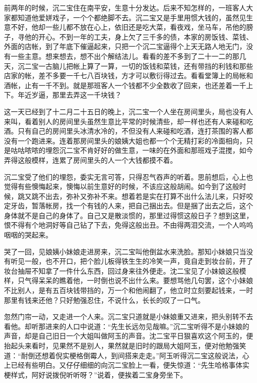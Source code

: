 \documentclass[12pt,UTF8]{ctexbook}
\begin{document}
{{{前两年的时候，沉二宝住在南平安，生意十分发达。后来不知怎样的，一班客人大家都知道他爱姘戏子，一个个都绝脚不去。沉二宝又是手里用惯大钱的，虽然见生意不好，他却一些儿都不放在心上，依旧还是吃大菜，看夜戏，坐马车，吊他的膀子，寻他的开心。不到一年的工夫，身上欠了三千多的债，本家的房饭钱、菜钱、外面的店帐，到了年底下催逼起来，只把一个沉二宝逼得个上天无路人地无门，没有一些主意。想来想去，想不出个解结法儿。看看的差不多到了二十一二的那几天，沉二宝一古脑儿把帐上算了一算，一切的饭钱和菜钱，还有带挡的利钱和那些店家的帐，差不多要一千七八百块钱，方才可以敷衍得过去。看看堂簿上的局帐和酒帐，止有一千不到。就是那班客人一个钱都不少全数收了回来，也还差着一千上下。年近岁逼，那里去弄这一千块钱？

这一天已经到了十二月二十五日的晚上，沉二宝一个人坐在房间里头，局也没有人来叫，看着别人的房间里头虽然生意比平常的时候清些，却一样也还有人来碰和吃酒。只有自己的房间里头冰清水冷的，不但没有人来碰和吃酒，连打茶围的客人都没有一个跑进来。连着那房间里头的娘姨大姐也都一个个无精打彩的冷面相向，只是咕咕哝哝的埋怨沉二宝不肯好好的做生意，一味的在外面和那班戏子混搅，如今弄得这般模样，连累了房间里头的人一个大钱都摸不着。

沉二宝受了他们的埋怨，委实无言可答，只得忍气吞声的听着。思前想后，心上也觉得有些懊悔起来，懊悔以前生意好的时候，不该应这般胡闹。如今到了这般时候，跳又跳不出去，弥补又弥补不来。想着若是实在打算不出什么法儿来，只好咬定牙齿，暂落帐房，找一个有钱的人来，把自己捆出去。但是捆了出去之后，这个身体就不是自己的身体了。自己又是散淡惯的，那里过得惯这般日子？想到这里，恨不得有个地洞好等自己钻了下去，免得这般出丑。不由得两泪交流，一个人呜呜咽咽的哭起来。

哭了一回，见娘姨小妹娘走进房来，沉二宝叫他倒盆水来洗脸。那知小妹娘只当没有听见一般，也不开口，把个脸儿板得铁生生的冷笑一声，竟自走到妆台前，开了妆台抽屉不知拿了一件什么东西，回过身来往外便走。沈二宝见了小妹娘这般模样，只气得呆呆的瞧着他，一时倒也说不出什么来。要想骂他几句罢，这个小妹娘不比别人，是有五百块钱带挡的，万一个和他闹翻了，他立时立刻要起钱来，一时那里有钱来还他？只好勉强忍住，不说什么，长长的叹了一口气。

忽然门帘一动，又走进一个人来。沉二宝只道就是小妹娘重又进来，把头别转不去看他。却听那进来的人口中说道：“先生长远勿见哉嘛。”沉二宝听得不是小妹娘的声音，却是自己旧日一个大姐叫做阿玉的声音。沈二宝平日狠喜欢这个阿玉的，便抬起头来看时，见果然不是别人，果然就是旧时的跟局大姐阿玉，便对他勉强笑道：“耐倒还想着倪实梗格倒霉人，到间搭来走走。”阿玉听得沉二宝这般说法，心上已经有些明白。又仔仔细细的向沉二宝脸上一看，便失惊道：“先生哈格事体实梗样式，阿好说拨倪听听呀？”说着，便挨着二宝身旁坐下。

}}}
\end{document}
